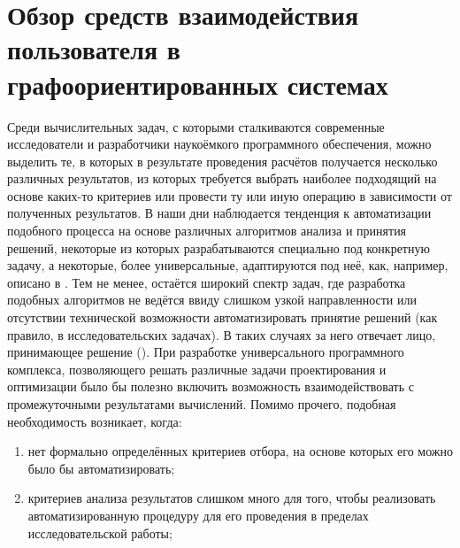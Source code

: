 \chapter{Обзор средств взаимодействия пользователя в графоориентированных системах} \label{chap1.comparison}
Среди вычислительных задач, с которыми сталкиваются современные исследователи и разработчики наукоёмкого программного обеспечения, можно выделить те, в которых в результате проведения расчётов получается несколько различных результатов, из которых требуется выбрать наиболее подходящий на основе каких-то критериев или провести ту или иную операцию в зависимости от полученных результатов. В наши дни наблюдается тенденция к автоматизации подобного процесса на основе различных алгоритмов анализа и принятия решений, некоторые из которых разрабатываются специально под конкретную задачу, а некоторые, более универсальные, адаптируются под неё, как, например, описано в \cite{KatalOpt2020}. Тем не менее, остаётся широкий спектр задач, где разработка подобных алгоритмов не ведётся ввиду слишком узкой направленности или отсутствии технической возможности автоматизировать принятие решений (как правило, в исследовательских задачах). В таких случаях за него отвечает лицо, принимающее решение (). При разработке универсального программного комплекса, позволяющего решать различные задачи проектирования и оптимизации было бы полезно включить возможность  взаимодействовать с промежуточными результатами вычислений. Помимо прочего, подобная необходимость возникает, когда:
\begin{enumerate}
    \item нет формально определённых критериев отбора, на основе которых его можно было бы автоматизировать;
    \item критериев анализа результатов слишком много для того, чтобы реализовать автоматизированную процедуру для его проведения в пределах исследовательской работы;
\end{enumerate}

